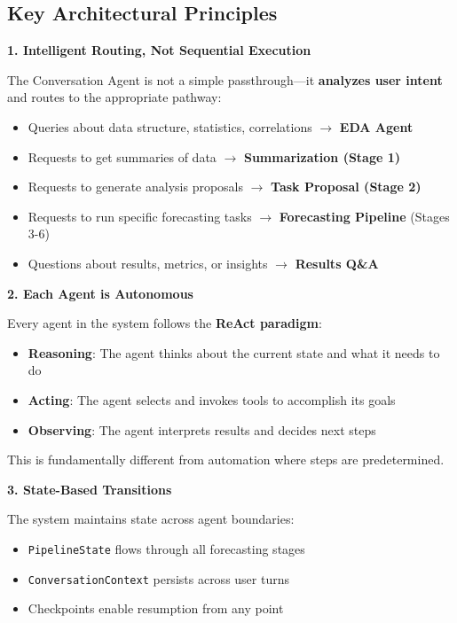 \documentclass[11pt,a4paper]{article}
\begin{document}
\subsection{Key Architectural Principles}

\textbf{1. Intelligent Routing, Not Sequential Execution}

The Conversation Agent is not a simple passthrough---it \textbf{analyzes user intent} and routes to the appropriate pathway:
\begin{itemize}
    \item Queries about data structure, statistics, correlations $\rightarrow$ \textbf{EDA Agent}
    \item Requests to get summaries of data $\rightarrow$ \textbf{Summarization (Stage 1)}
    \item Requests to generate analysis proposals $\rightarrow$ \textbf{Task Proposal (Stage 2)}
    \item Requests to run specific forecasting tasks $\rightarrow$ \textbf{Forecasting Pipeline} (Stages 3-6)
    \item Questions about results, metrics, or insights $\rightarrow$ \textbf{Results Q\&A}
\end{itemize}

\textbf{2. Each Agent is Autonomous}

Every agent in the system follows the \textbf{ReAct paradigm}:
\begin{itemize}
    \item \textbf{Reasoning}: The agent thinks about the current state and what it needs to do
    \item \textbf{Acting}: The agent selects and invokes tools to accomplish its goals
    \item \textbf{Observing}: The agent interprets results and decides next steps
\end{itemize}

This is fundamentally different from automation where steps are predetermined.

\textbf{3. State-Based Transitions}

The system maintains state across agent boundaries:
\begin{itemize}
    \item \texttt{PipelineState} flows through all forecasting stages
    \item \texttt{ConversationContext} persists across user turns
    \item Checkpoints enable resumption from any point
\end{itemize}
\end{document}
